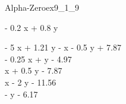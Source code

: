 
\begin{bilevelmodel}{Alpha-Zero}{ex9_1_9}
    \begin{upperlevel}{- 0.2 x + 0.8 y}{
        
    }
    \end{upperlevel}
    \begin{lowerlevel}{- 5 x + 1.21 y}{
         - x - 0.5 y + 7.87  \\ 
 - 0.25 x + y - 4.97  \\ 
 x + 0.5 y - 7.87  \\ 
 x - 2 y - 11.56  \\ 
 - y - 6.17 
    }
    \end{lowerlevel}
\end{bilevelmodel}
    
        